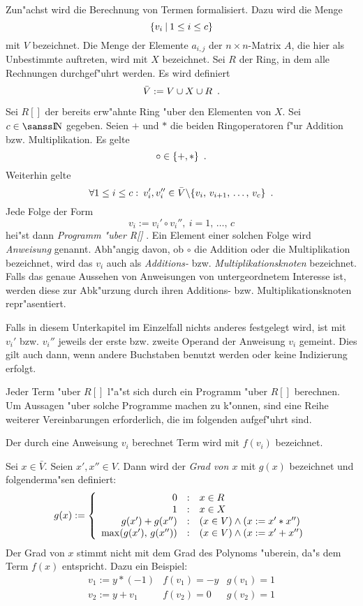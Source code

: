 Zun"achst wird die Berechnung von Termen formalisiert.
Dazu wird die Menge \[  \{v_i \: | \: 1 \leq i \leq c \} \]
mit $V$ bezeichnet. Die Menge der
Elemente $a_{i,j}$ der $n \times n$-Matrix $A$, die hier als
Unbestimmte auftreten, wird mit $X$ bezeichnet. Sei $R$ der Ring, in dem
alle Rechnungen durchgef"uhrt werden. Es wird definiert
\[ \bar{V} := V \cup X \cup R \mbox{\hspace{0.5em}.} \]

\MyBeginDef
\label{DefProgramm}
    Sei $R[]$ der bereits erw"ahnte Ring "uber den Elementen von $X$.
    Sei $c \in \Nat$ gegeben. Seien $+$ und $*$ die
    beiden Ringoperatoren f"ur Addition bzw. Multiplikation.
    Es gelte \[ \circ \in \{+,*\} \mbox{\hspace{0.5em}.} \] Weiterhin gelte
    \[ \forall 1\leq i\leq c: \: v_i', v_i'' \in \bar{V}
           \backslash \{ v_i, \, v_{i+1}, \, \ldots, \, v_c \} \mbox{\hspace{0.5em}.}
    \]
    Jede Folge der Form
    \[ v_i := v_i' \circ v_i'', \: i = 1, \, \ldots, \, c \]
    hei"st dann { \em Programm "uber R[] } . 
    Ein Element einer solchen Folge wird {\em Anweisung} genannt. Abh"angig
    davon, ob $\circ$ die Addition oder die Multiplikation bezeichnet, wird
    das $v_i$ auch als {\em Additions-} bzw.
    {\em Multiplikationsknoten} bezeichnet. Falls das genaue Aussehen von
    Anweisungen von untergeordnetem Interesse ist, werden diese zur
    Abk"urzung durch ihren Additions- bzw. Multiplikationsknoten
    repr"asentiert.
\MyEndDef

Falls in diesem Unterkapitel im Einzelfall nichts anderes festgelegt wird,
ist mit $v_i'$ bzw. $v_i''$ jeweils der erste bzw. zweite Operand der 
Anweisung $v_i$ gemeint. Dies gilt auch dann, wenn andere Buchstaben
benutzt werden oder keine Indizierung erfolgt.

Jeder Term "uber $R[]$ l"a"st sich durch ein Programm "uber $R[]$
berechnen. Um Aussagen "uber solche Programme machen zu k"onnen, sind
eine Reihe weiterer Vereinbarungen erforderlich, die im folgenden
aufgef"uhrt sind.

Der durch eine Anweisung $v_i$ berechnet Term wird mit $f(v_i)$
bezeichnet.

Sei $x \in \bar{V}$. Seien $x',x'' \in V$.
Dann wird der {\em Grad von $x$} mit $g(x)$
bezeichnet und folgenderma"sen definiert:
\[ g(x) := \left\{
           \begin{array}{rcl}
               0 & : & x \in R \\
               1 & : & x \in X \\
               g(x') + g(x'') & : & (x \in V) \wedge (x := x' * x'') \\
               \max(g(x'),\, g(x'')) & : &
                                    (x \in V) \wedge (x := x' + x'')
           \end{array}
           \right.
\]
Der Grad von $x$ stimmt nicht mit dem Grad des Polynoms "uberein,
da"s dem Term $f(x)$ entspricht. Dazu ein Beispiel: \nopagebreak[3]
\[
    \begin{array}{ccc}
        v_1:= y * (-1) & f(v_1) = -y & g(v_1)=1 \\  
        v_2:= y + v_1  & f(v_2) = 0  & g(v_2)=1
    \end{array}
\]

